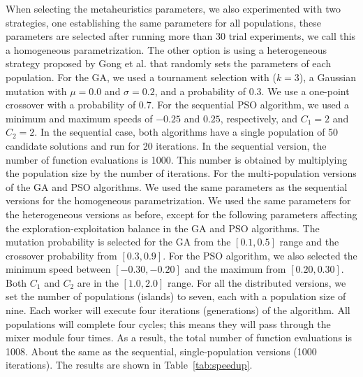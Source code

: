 \documentclass[runningheads]{llncs}
\begin{document}
When selecting the metaheuristics parameters, we also experimented with two
strategies, one establishing the same parameters for all populations, these
parameters are selected after running more than 30 trial experiments, we call
this a homogeneous parametrization. The other option is using a heterogeneous
strategy proposed by Gong et al. \cite{gong2011distributed} that randomly sets
the parameters of each population. For the GA, we used a tournament selection
with ($k=3$), a Gaussian mutation with $\mu = 0.0$ and $\sigma = 0.2$, and a
probability of $0.3$. We use a one-point crossover with a probability of $0.7$.
For the sequential PSO algorithm, we used a minimum and maximum speeds of
$-0.25$ and $0.25$, respectively, and $C_1=2$ and $C_2=2$. In the sequential
case, both algorithms have a single population of 50 candidate solutions and
run for 20 iterations. In the sequential version, the number of function
evaluations is 1000. This number is obtained by multiplying the population size
by the number of iterations. For the multi-population versions of the GA and
PSO algorithms. We used the same parameters as the sequential versions for the
homogeneous parametrization. We used the same parameters for the heterogeneous
versions as before, except for the following parameters affecting the
exploration-exploitation balance in the GA and PSO algorithms. The mutation
probability is selected for the GA from the $[0.1,0.5]$ range and the crossover
probability from $[0.3,0.9]$. For the PSO algorithm, we also selected the
minimum speed between $[-0.30,-0.20]$ and the maximum from $[0.20,0.30]$. Both
$C_1$ and $C_2$ are in the $[1.0,2.0]$ range. For all the distributed versions,
we set the number of populations (islands) to seven, each with a population
size of nine. Each worker will execute four iterations (generations) of the
algorithm. All populations will complete four cycles; this means they will pass
through the mixer module four times. As a result, the total number of function
evaluations is 1008. About %
the same as the sequential, single-population 
versions (1000 iterations). The results are shown in Table~\ref{tab:speedup}.
\end{document}
